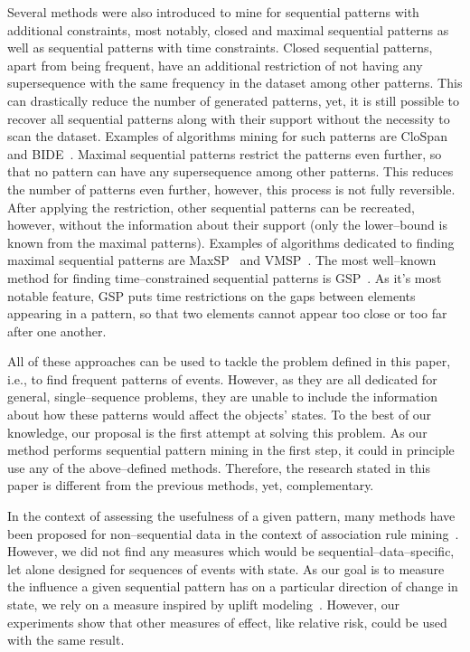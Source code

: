 \documentclass[runningheads,a4paper]{llncs}
\begin{document}
Several methods were also introduced to mine for sequential patterns with additional constraints, most notably, closed and maximal sequential patterns as well as sequential patterns with time constraints.
Closed sequential patterns, apart from being frequent, have an additional restriction of not having any supersequence with the same frequency in the dataset among other patterns.
This can drastically reduce the number of generated patterns, yet, it is still possible to recover all sequential patterns along with their support without the necessity to scan the dataset.
Examples of algorithms mining for such patterns are CloSpan~\cite{Yan:2003} and BIDE~\cite{Wang:2004}.
Maximal sequential patterns restrict the patterns even further, so that no pattern can have any supersequence among other patterns.
This reduces the number of patterns even further, however, this process is not fully reversible.
After applying the restriction, other sequential patterns can be recreated, however, without the information about their support (only the lower--bound is known from the maximal patterns).
Examples of algorithms dedicated to finding maximal sequential patterns are MaxSP~\cite{Fournier:2013} and VMSP~\cite{Fournier:2014-2}.
The most well--known method for finding time--constrained sequential patterns is GSP~\cite{Srikant:1996}.
As it's most notable feature, GSP puts time restrictions on the gaps between elements appearing in a pattern, so that two elements cannot appear too close or too far after one another.

All of these approaches can be used to tackle the problem defined in this paper, i.e., to find frequent patterns of events.
However, as they are all dedicated for general, single--sequence problems, they are unable to include the information about how these patterns would affect the objects' states.
To the best of our knowledge, our proposal is the first attempt at solving this problem.
As our method performs sequential pattern mining in the first step, it could in principle use any of the above--defined methods.
Therefore, the research stated in this paper is different from the previous methods, yet, complementary.

In the context of assessing the usefulness of a given pattern, many methods have been proposed for non--sequential data in the context of association rule mining~\cite{Lenca:2007,Tan:2002}.
However, we did not find any measures which would be sequential--data--specific, let alone designed for sequences of events with state.
As our goal is to measure the influence a given sequential pattern has on a particular direction of change in state, we rely on a measure inspired by uplift modeling~\cite{Radcliffe:1999}.
However, our experiments show that other measures of effect, like relative risk, could be used with the same result.
\end{document}
